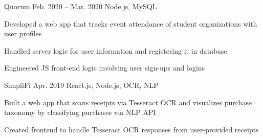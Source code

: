 \begin{cvprojects}



  \cvproject
  {Quorum}
  {\href{https://github.com/KevinIsMyName/Quorum}{\faGithubSquare\acvHeaderIconSep\@KevinIsMyName}}
  {Feb. 2020 -- Mar. 2020}
  {Node.js, MySQL}
  {
    \begin{cvitems}
      \item {Developed a web app that tracks event attendance of student organizations with user profiles}
      \item {Handled server logic for user information and registering it in database}
      \item {Engineered JS front-end logic involving user sign-ups and logins}
    \end{cvitems}
  }

  \cvproject
  {SimpliFi}
  {\href{https://github.com/unitehenry/simply-finance}{\faGithubSquare\acvHeaderIconSep{}}}
  {Apr. 2019}
  {React.js, Node.js, OCR, NLP}
  {
    \begin{cvitems}
      \item {Built a web app that scans receipts via Tesseract OCR and visualizes purchase taxonomy by classifying purchases via NLP API}
      \item {Created frontend to handle Tesseract OCR responses from user-provided receipts}
    \end{cvitems}
  }


\end{cvprojects}
